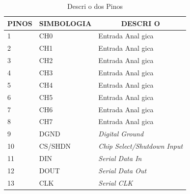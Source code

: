 \documentclass{article}
\begin{document}
\begin{table}[]
\centering
\begin{center}
\caption{Descri o dos Pinos}
\label{center}
\begin{tabular}{|l|l|l|}
\hline
\multicolumn{1}{|c|}{\textbf{PINOS}} & \multicolumn{1}{c|}{\textbf{SIMBOLOGIA}} & \multicolumn{1}{c|}{\textbf{DESCRI O}} \\ \hline
1                                    & CH0                                      & Entrada Anal gica                       \\ \hline
2                                    & CH1                                      & Entrada Anal gica                       \\ \hline
3                                    & CH2                                      & Entrada Anal gica                       \\ \hline
4                                    & CH3                                      & Entrada Anal gica                       \\ \hline
5                                    & CH4                                      & Entrada Anal gica                       \\ \hline
6                                    & CH5                                      & Entrada Anal gica                       \\ \hline
7                                    & CH6                                      & Entrada Anal gica                       \\ \hline
8                                    & CH7                                      & Entrada Anal gica                       \\ \hline
9                                    & DGND                                     & \textit{Digital Ground}                 \\ \hline
10                                   & CS/SHDN                                  & \textit{Chip Select/Shutdown Input}     \\ \hline
11                                   & DIN                                      & \textit{Serial Data In}                 \\ \hline
12                                   & DOUT                                     & \textit{Serial Data Out}                \\ \hline
13                                   & CLK                                      & \textit{Serial CLK}                     \\ \hline

\end{tabular}
\end{center}
\end{table}
\end{document}
